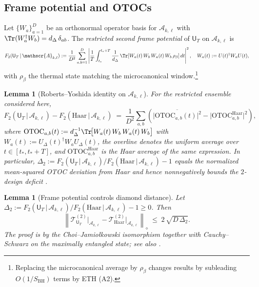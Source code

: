 \documentclass[aps,prd,preprint,onecolumn,superscriptaddress,nofootinbib,longbibliography,floatfix,11pt,showpacs,showkeys]{revtex4-2}
\theoremstyle{plain}
\newtheorem{lemma}[theorem]{Lemma}
\theoremstyle{definition}
\theoremstyle{remark}
\begin{document}
\subsection*{Frame potential and OTOCs}
Let $\{W_a\}_{a=1}^{D}$ be an orthonormal operator basis for $\mathscr{A}_{k,\ell}$ with $\Tr(W_a^\dagger W_b)=d_\Delta\,\delta_{ab}$.  The {\em restricted second frame potential} of $\mathsf{U}_T$ on $\mathscr{A}_{k,\ell}$ is
\begin{equation}
  F_2(\mathsf{U}_T \,|\, \mathscr{A}_{k,\ell}) := \frac{1}{D^2} \sum_{a,b=1}^{D}
   \left| \frac{1}{T}\int_{t_\ast}^{t_\ast+T} \frac{1}{d_\Delta}\, \Tr\!\left[ W_a(t) \, W_b \, W_a(t) \, W_b \, \rho_\beta \right] dt \right|^2,
   \quad W_a(t):=U(t)^\dagger W_a U(t),
\end{equation}
with $\rho_\beta$ the thermal state matching the microcanonical window.\footnote{Replacing the microcanonical average by $\rho_\beta$ changes results by subleading $O(1/S_{\mathrm{BH}})$ terms by ETH (A2).}

\begin{lemma}[Roberts--Yoshida identity on $\mathscr{A}_{k,\ell}$]\label{lem:RY}
For the restricted ensemble considered here,
\begin{equation}
  F_2(\mathsf{U}_T \,|\, \mathscr{A}_{k,\ell}) - F_2(\mathrm{Haar} \,|\, \mathscr{A}_{k,\ell})
  \;=\; \frac{1}{D^2}\sum_{a,b}\left( \overline{\big| \mathrm{OTOC}_{a,b}(t) \big|^2} - \big| \mathrm{OTOC}^{\mathrm{Haar}}_{a,b} \big|^2 \right),
\end{equation}
where $\mathrm{OTOC}_{a,b}(t):= d_\Delta^{-1}\Tr\!\big[ W_a(t)\,W_b\,W_a(t)\,W_b \big]$ with $W_a(t):=U_\Delta(t)^\dagger W_a U_\Delta(t)$,
the overline denotes the uniform average over $t\in[t_\ast,t_\ast+T]$, and $\mathrm{OTOC}^{\mathrm{Haar}}_{a,b}$ is the Haar average of the same expression.
In particular, $\Delta_2:=F_2(\mathsf{U}_T \,|\, \mathscr{A}_{k,\ell})/F_2(\mathrm{Haar} \,|\, \mathscr{A}_{k,\ell})-1$ equals the normalized mean-squared OTOC deviation from Haar and hence nonnegatively bounds the $2$-design deficit \cite{RobertsYoshida:2017}.
\end{lemma}

\begin{lemma}[Frame potential controls diamond distance]\label{lem:FP-diamond}
Let $\Delta_2:=F_2(\mathsf{U}_T \,|\, \mathscr{A}_{k,\ell})/F_2(\mathrm{Haar} \,|\, \mathscr{A}_{k,\ell})-1\ge 0$.  
Then
\begin{equation}
 \left\| \mathcal{T}^{(2)}_{\mathsf{U}_T}\big|_{\mathscr{A}_{k,\ell}} - \mathcal{T}^{(2)}_{\mathrm{Haar}}\big|_{\mathscr{A}_{k,\ell}} \right\|_{\diamond}
 \;\le\; 2\, \sqrt{ D \, \Delta_2 }.
\end{equation}
The proof is by the Choi--Jamio\l{}kowski isomorphism together with Cauchy--Schwarz on the maximally entangled state; see also \cite{RobertsYoshida:2017,Brandao:2016}.
\end{lemma}
\end{document}
